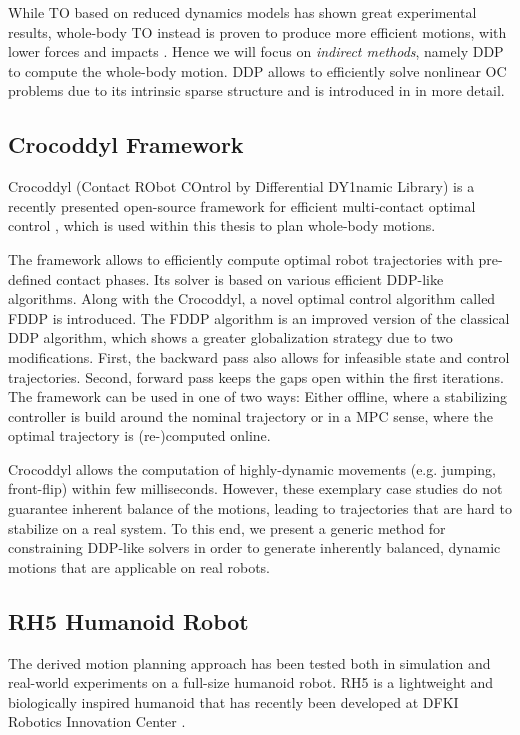 While \gls{TO} based on reduced dynamics models has shown great experimental results, whole-body \gls{TO} instead is proven to produce more efficient motions, with lower forces and impacts \cite{budhiraja2018differential}. Hence we will focus on \textit{indirect methods}, namely \gls{DDP} to compute the whole-body motion. \gls{DDP} allows to efficiently solve nonlinear \gls{OC} problems due to its intrinsic sparse structure and is introduced in  in more detail.

\subsection{Crocoddyl Framework} 
Crocoddyl (Contact RObot COntrol by Differential DY1namic Library) is a recently presented open-source framework for efficient multi-contact optimal control \cite{mastalli20crocoddyl}, which is used within this thesis to plan whole-body motions. 

The framework allows to efficiently compute optimal robot trajectories with pre-defined contact phases. Its solver is based on various efficient \gls{DDP}-like algorithms. Along with the Crocoddyl, a novel optimal control algorithm called \gls{FDDP} is introduced. The \gls{FDDP} algorithm is an improved version of the classical \gls{DDP} algorithm, which shows a greater globalization strategy due to two modifications. First, the backward pass also allows for infeasible state and control trajectories. Second, forward pass keeps the gaps open within the first iterations. 
The framework can be used in one of two ways: Either offline, where a stabilizing controller is build around the nominal trajectory \cite{giraud2020motion} or in a \gls{MPC} sense, where the optimal trajectory is (re-)computed online. 

Crocoddyl allows the computation of highly-dynamic movements (e.g. jumping, front-flip) within few milliseconds. However, these exemplary case studies do not guarantee inherent balance of the motions, leading to trajectories that are hard to stabilize on a real system. To this end, we present a generic method for constraining DDP-like solvers in order to generate inherently balanced, dynamic motions that are applicable on real robots.    

\subsection{RH5 Humanoid Robot}\label{subsec:RH5}
The derived motion planning approach has been tested both in simulation and real-world experiments on a full-size humanoid robot. RH5 is a lightweight and biologically inspired humanoid that has recently been developed at DFKI Robotics Innovation Center \cite{peters2017konstruktion}.


